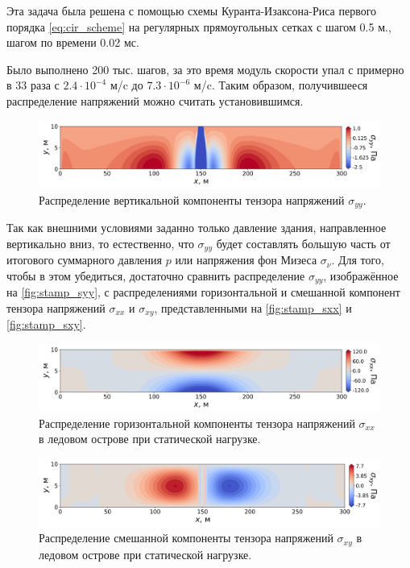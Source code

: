 Эта задача была решена с помощью схемы Куранта-Изаксона-Риса первого порядка \eqref{eq:cir_scheme} на регулярных прямоугольных сетках с шагом 0.5  м., шагом по времени 0.02 мс.

Было выполнено 200 тыс. шагов, за это время модуль скорости упал с примерно в 33 раза с $2.4\cdot10^{-4}$ м/c до $7.3\cdot10^{-6}$ м/c. Таким образом, получившееся распределение напряжений можно считать установившимся.

\begin{figure}[htb]
    \centering
    \includegraphics[width=\textwidth]{images/stamp/stamp_syy.png}
    \caption{Распределение вертикальной компоненты тензора напряжений $\sigma_{yy}$.}
    \label{fig:stamp_syy}
\end{figure}

Так как внешними условиями заданно только давление здания, направленное вертикально вниз, то естественно, что $\sigma_{yy}$ будет составлять большую часть от итогового суммарного давления $p$ или напряжения фон Мизеса $\sigma_\nu$. Для того, чтобы в этом убедиться, достаточно сравнить распределение $\sigma_{yy}$, изображённое на \autoref{fig:stamp_syy}, с распределениями горизонтальной и смешанной компонент тензора напряжений $\sigma_{xx}$ и $\sigma_{xy}$, представленными на \autoref{fig:stamp_sxx} и \autoref{fig:stamp_sxy}.

\begin{figure}[H]
    \centering
    \includegraphics[width=\textwidth]{images/stamp/stamp_sxx.png}
    \caption{Распределение горизонтальной компоненты тензора напряжений $\sigma_{xx}$ в ледовом острове при статической нагрузке.}
    \label{fig:stamp_sxx}
\end{figure}

\begin{figure}[H]
    \centering
    \includegraphics[width=\textwidth]{images/stamp/stamp_sxy.png}
    \caption{Распределение смешанной компоненты тензора напряжений $\sigma_{xy}$ в ледовом острове при статической нагрузке.}
    \label{fig:stamp_sxy}
\end{figure}

